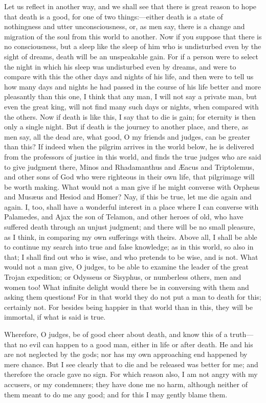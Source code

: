 \documentclass[12pt]{article}
\begin{document}
Let us reflect in another way, and we shall see that there is great
reason to hope that death is a good, for one of two things:---either
death is a state of nothingness and utter unconsciousness, or, as
men say, there is a change and migration of the soul from this world
to another. Now if you suppose that there is no consciousness, but
a sleep like the sleep of him who is undisturbed even by the sight
of dreams, death will be an unspeakable gain. For if a person were
to select the night in which his sleep was undisturbed even by dreams,
and were to compare with this the other days and nights of his life,
and then were to tell us how many days and nights he had passed in
the course of his life better and more pleasantly than this one, I
think that any man, I will not say a private man, but even the great
king, will not find many such days or nights, when compared with the
others. Now if death is like this, I say that to die is gain; for
eternity is then only a single night. But if death is the journey
to another place, and there, as men say, all the dead are, what good,
O my friends and judges, can be greater than this? If indeed when
the pilgrim arrives in the world below, he is delivered from the professors
of justice in this world, and finds the true judges who are said to
give judgment there, Minos and Rhadamanthus and {\AE}acus and Triptolemus,
and other sons of God who were righteous in their own life, that pilgrimage
will be worth making. What would not a man give if he might converse
with Orpheus and Mus{\ae}us and Hesiod and Homer? Nay, if this be true,
let me die again and again. I, too, shall have a wonderful interest
in a place where I can converse with Palamedes, and Ajax the son of
Telamon, and other heroes of old, who have suffered death through
an unjust judgment; and there will be no small pleasure, as I think,
in comparing my own sufferings with theirs. Above all, I shall be
able to continue my search into true and false knowledge; as in this
world, so also in that; I shall find out who is wise, and who pretends
to be wise, and is not. What would not a man give, O judges, to be
able to examine the leader of the great Trojan expedition; or Odysseus
or Sisyphus, or numberless others, men and women too! What infinite
delight would there be in conversing with them and asking them questions!
For in that world they do not put a man to death for this; certainly
not. For besides being happier in that world than in this, they will
be immortal, if what is said is true.

Wherefore, O judges, be of good cheer about death, and know this of
a truth---that no evil can happen to a good man, either in life or
after death. He and his are not neglected by the gods; nor has my
own approaching end happened by mere chance. But I see clearly that
to die and be released was better for me; and therefore the oracle
gave no sign. For which reason also, I am not angry with my accusers,
or my condemners; they have done me no harm, although neither of them
meant to do me any good; and for this I may gently blame them.
\end{document}
